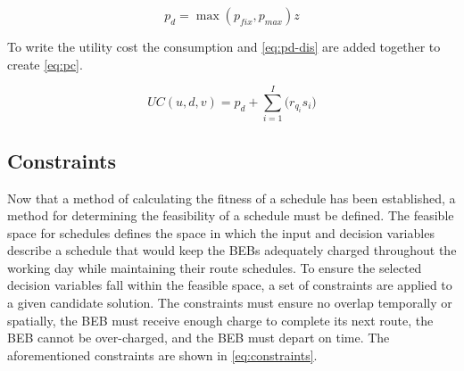 \documentclass[11pt,a4paper,final]{article}
\newcommand{\UC}{UC(u, d, v)}               %
\begin{document}
\begin{equation}
\label{eq:pd-dis}
  p_d = \max(p_{fix}, p_{max})z
\end{equation}

To write the utility cost the consumption and \ref{eq:pd-dis} are added together to create \ref{eq:pc}.

\begin{equation}
\label{eq:pc}
\UC = p_d + \sum_{i=1}^I \Big( r_{q_i}s_i \Big)
\end{equation}

\subsection{Constraints}
\label{sec:constraints}
Now that a method of calculating the fitness of a schedule has been established, a method for determining the
feasibility of a schedule must be defined. The feasible space for schedules defines the space in which the input and
decision variables describe a schedule that would keep the BEBs adequately charged throughout the working day while
maintaining their route schedules. To ensure the selected decision variables fall within the feasible space, a set of
constraints are applied to a given candidate solution. The constraints must ensure no overlap temporally or spatially,
the BEB must receive enough charge to complete its next route, the BEB cannot be over-charged, and the BEB must depart
on time. The aforementioned constraints are shown in \ref{eq:constraints}.
\end{document}
